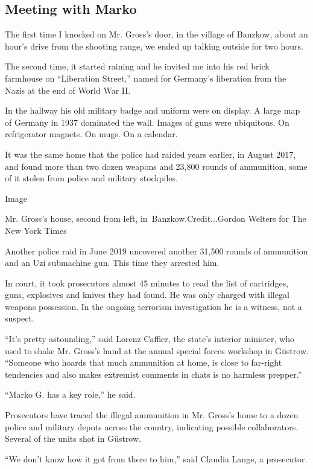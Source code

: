 \hypertarget{meeting-with-marko}{%
\subsection{Meeting with Marko}\label{meeting-with-marko}}

The first time I knocked on Mr. Gross's door, in the village of Banzkow,
about an hour's drive from the shooting range, we ended up talking
outside for two hours.

The second time, it started raining and he invited me into his red brick
farmhouse on ``Liberation Street,'' named for Germany's liberation from
the Nazis at the end of World War II.

In the hallway his old military badge and uniform were on display. A
large map of Germany in 1937 dominated the wall. Images of guns were
ubiquitous. On refrigerator magnets. On mugs. On a calendar.

It was the same home that the police had raided years earlier, in August
2017, and found more than two dozen weapons and 23,800 rounds of
ammunition, some of it stolen from police and military stockpiles.

Image

Mr. Gross's house, second from left, in~Banzkow.Credit...Gordon Welters
for The New York Times

Another police raid in June 2019 uncovered another 31,500 rounds of
ammunition and an Uzi submachine gun. This time they arrested him.

In court, it took prosecutors almost 45 minutes to read the list of
cartridges, guns, explosives and knives they had found. He was only
charged with illegal weapons possession. In the ongoing terrorism
investigation he is a witness, not a suspect.

``It's pretty astounding,'' said Lorenz Caffier, the state's interior
minister, who used to shake Mr. Gross's hand at the annual special
forces workshop in Güstrow. ``Someone who hoards that much ammunition at
home, is close to far-right tendencies and also makes extremist comments
in chats is no harmless prepper.''

``Marko G. has a key role,'' he said.

Prosecutors have traced the illegal ammunition in Mr. Gross's home to a
dozen police and military depots across the country, indicating possible
collaborators. Several of the units shot in Güstrow.

``We don't know how it got from there to him,'' said Claudia Lange, a
prosecutor.

